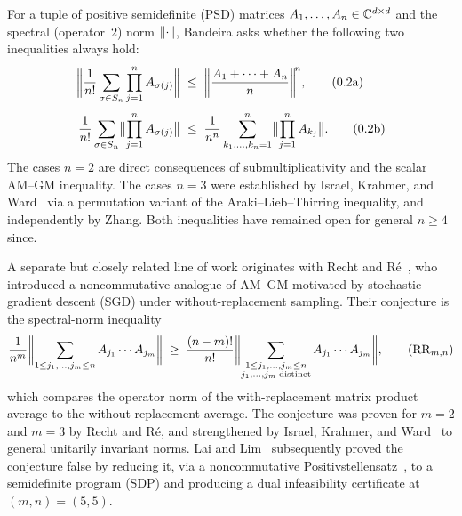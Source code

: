 For a tuple of positive semidefinite (PSD) matrices
$A_1,\dots,A_n \in \C^{d\times d}$ and the spectral (operator~$2$)
norm $\opnorm{\cdot}$, Bandeira asks whether the following two
inequalities always hold:
\begin{align}
  \label{eq:bandeira-a}
  \opnorm[\bigg]{\frac{1}{n!}\sum_{\sigma \in \Sn}
    \prod_{j=1}^n A_{\sigma(j)}}
    &\;\le\;
    \opnorm[\bigg]{\frac{A_1+\cdots+A_n}{n}}^{\!n},
    \tag{0.2a}\\[0.3em]
  \label{eq:bandeira-b}
  \frac{1}{n!}\sum_{\sigma \in \Sn}
    \opnorm[\big]{\prod_{j=1}^n A_{\sigma(j)}}
    &\;\le\;
    \frac{1}{n^n}\sum_{k_1,\dots,k_n=1}^{n}
    \opnorm[\big]{\prod_{j=1}^n A_{k_j}}.
    \tag{0.2b}
\end{align}
The cases $n=2$ are direct consequences of submultiplicativity and the
scalar AM--GM inequality.  The cases $n=3$ were established by
Israel, Krahmer, and Ward~\cite{IsraelKrahmerWard2016} via a
permutation variant of the Araki--Lieb--Thirring inequality, and
independently by Zhang.  Both inequalities have remained open for
general $n\ge 4$ since.

A separate but closely related line of work originates with Recht
and R\'e~\cite{RechtRe2012}, who introduced a noncommutative analogue
of AM--GM motivated by stochastic gradient descent (SGD) under
without-replacement sampling.  Their conjecture is the spectral-norm
inequality
\begin{equation}
  \label{eq:rrm}
  \frac{1}{n^{m}}
  \opnorm[\bigg]{\sum_{1\le j_1,\dots,j_m\le n}
    A_{j_1}\cdots A_{j_m}}
  \;\ge\;
  \frac{(n-m)!}{n!}
  \opnorm[\bigg]{\sum_{\substack{1\le j_1,\dots,j_m\le n\\
    j_1,\dots,j_m \;\text{distinct}}}
    A_{j_1}\cdots A_{j_m}},
  \tag{$\RR_{m,n}$}
\end{equation}
which compares the operator norm of the with-replacement matrix product
average to the without-replacement average.  The conjecture was
proven for $m=2$ and $m=3$ by Recht and R\'e, and strengthened by
Israel, Krahmer, and Ward~\cite{IsraelKrahmerWard2016} to general
unitarily invariant norms.  Lai and Lim~\cite{LaiLim2020}
subsequently proved the conjecture false by reducing it, via a
noncommutative Positivstellensatz~\cite{Helton2002}, to a semidefinite
program (SDP) and producing a dual infeasibility certificate at
$(m,n)=(5,5)$.

